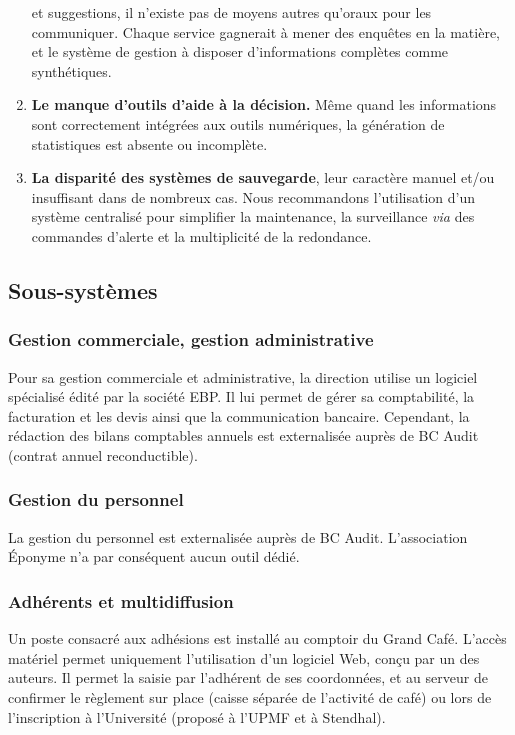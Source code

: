 \begin{enumerate}
      et suggestions, il n'existe pas de moyens autres qu'oraux pour les communiquer.
      Chaque service gagnerait à mener des enquêtes en la matière, et le système de gestion
      à disposer d'informations complètes comme synthétiques.
\item \textbf{Le manque d'outils d'aide à la décision.} Même quand les informations sont correctement
      intégrées aux outils numériques, la génération de statistiques est absente ou
      incomplète.
\item \textbf{La disparité des systèmes de sauvegarde}, leur caractère manuel et/ou insuffisant
      dans de nombreux cas.
      Nous recommandons l'utilisation d'un système centralisé pour simplifier la maintenance,
      la surveillance \textit{via} des commandes d'alerte et la multiplicité de la redondance.
\end{enumerate}

\subsection{Sous-systèmes}

\subsubsection{Gestion commerciale, gestion administrative}

Pour sa gestion commerciale et administrative, la direction utilise un logiciel spécialisé
 édité par la société EBP.
Il lui permet de gérer sa comptabilité, la facturation et les devis ainsi que la
communication bancaire. Cependant, la rédaction des bilans comptables annuels est
externalisée auprès de BC Audit (contrat annuel reconductible).

\subsubsection{Gestion du personnel}

La gestion du personnel est externalisée auprès de BC Audit.
L'association Éponyme n'a par conséquent aucun outil dédié.

\subsubsection{Adhérents et multidiffusion}
\label{multidiffusion}

Un poste consacré aux adhésions est installé au comptoir du Grand Café.
L'accès matériel permet uniquement l'utilisation d'un logiciel Web, conçu par un des auteurs.
Il permet la saisie par l'adhérent de ses coordonnées, et au serveur de confirmer
le règlement sur place (caisse séparée de l'activité de café) ou lors de l'inscription
à l'Université (proposé à l'UPMF et à Stendhal).

